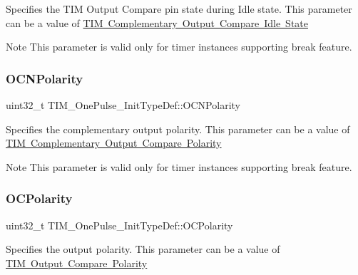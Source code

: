 Specifies the T\+IM Output Compare pin state during Idle state. This parameter can be a value of \mbox{\hyperlink{group___t_i_m___output___compare___n___idle___state}{T\+IM Complementary Output Compare Idle State}} \begin{DoxyNote}{Note}
This parameter is valid only for timer instances supporting break feature. 
\end{DoxyNote}
\mbox{\label{struct_t_i_m___one_pulse___init_type_def_a00deac6c3347b0482955d936351c6388}} 
\subsubsection{\texorpdfstring{OCNPolarity}{OCNPolarity}}
{\footnotesize\ttfamily uint32\+\_\+t T\+I\+M\+\_\+\+One\+Pulse\+\_\+\+Init\+Type\+Def\+::\+O\+C\+N\+Polarity}

Specifies the complementary output polarity. This parameter can be a value of \mbox{\hyperlink{group___t_i_m___output___compare___n___polarity}{T\+IM Complementary Output Compare Polarity}} \begin{DoxyNote}{Note}
This parameter is valid only for timer instances supporting break feature. 
\end{DoxyNote}
\mbox{\label{struct_t_i_m___one_pulse___init_type_def_a3028787ad41698072cbf70ddf1b6c984}} 
\subsubsection{\texorpdfstring{OCPolarity}{OCPolarity}}
{\footnotesize\ttfamily uint32\+\_\+t T\+I\+M\+\_\+\+One\+Pulse\+\_\+\+Init\+Type\+Def\+::\+O\+C\+Polarity}

Specifies the output polarity. This parameter can be a value of \mbox{\hyperlink{group___t_i_m___output___compare___polarity}{T\+IM Output Compare Polarity}} \mbox{\label{struct_t_i_m___one_pulse___init_type_def_a4f1fbf6d60812c3194e9ee8a05f5cfa6}} 

